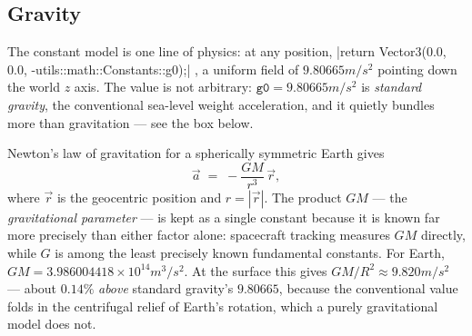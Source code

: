 \subsection{Gravity}\label{sec:environment-gravity}

The constant model is one line of physics: at any position,
\cppinline|return Vector3(0.0, 0.0, -utils::math::Constants::g0);|
, a uniform field of $9.80665\unit{m/s^2}$ pointing down
the world $z$ axis. The value is not arbitrary: $\mathtt{g0} = 9.80665\unit{m/s^2}$
 is \emph{standard gravity}, the conventional sea-level
weight acceleration, and it quietly bundles more than gravitation --- see the box below.

\begin{physbox}
Newton's law of gravitation for a spherically symmetric Earth gives
\begin{equation*}
\vec a \;=\; -\frac{GM}{r^{3}}\,\vec r,
\end{equation*}
where $\vec r$ is the geocentric position and $r = |\vec r|$. The product $GM$ --- the
\emph{gravitational parameter} --- is kept as a single constant because it is known far more
precisely than either factor alone: spacecraft tracking measures $GM$ directly, while $G$ is
among the least precisely known fundamental constants. For Earth,
$GM = 3.986004418\times10^{14}\unit{m^3/s^2}$. At the surface this gives
$GM/R^{2} \approx 9.820\unit{m/s^2}$ --- about $0.14\%$ \emph{above} standard gravity's
$9.80665$, because the conventional value folds in the centrifugal relief of Earth's
rotation, which a purely gravitational model does not.
\end{physbox}

